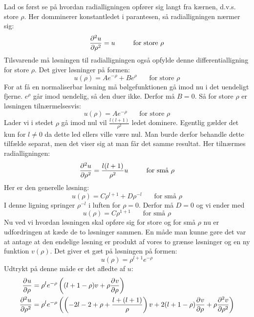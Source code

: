 \documentclass[../../Atom-ogMolekylefysik.tex]{subfiles}
\begin{document}
Lad os først se på hvordan radialligningen opfører sig langt fra kærnen, d.v.s. store $\rho$. Her domminerer konstantledet i parantesen, så radialligningen nærmer sig:
\begin{equation}
    \pdif[2]{\rho}{u}=u~~~~~~~~\text{for store $\rho$}
\end{equation}
Tilsvarende må løsningen til radialligningen også opfylde denne differentialligning for store $\rho$. Det giver løsninger på formen:
\begin{equation}
    u(\rho) = Ae^{-\rho}+B e^\rho~~~~~~~~\text{for store $\rho$}
\end{equation}
For at få en normaliserbar løsning må bølgefunktionen gå imod nu i det uendeligt fjerne. $e^\rho$ går imod uendelig, så den duer ikke. Derfor må $B=0$. Så for store $\rho$ er løsningen tilnærmelsesvis:
\begin{equation}
    u(\rho) = Ae^{-\rho}~~~~~~~~\text{for store $\rho$}
\end{equation}
Lader vi i stedet $\rho$ gå imod nul vil $\frac{l(l+1)}{\rho^2}$ ledet dominere. Egentlig gælder det kun for $l\neq0$ da dette led ellers ville være nul. Man burde derfor behandle dette tilfælde separat, men det viser sig at man får det samme resultat. Her tilnærmes radialligningen:
\begin{equation}
    \pdif[2]{\rho}{u}= \frac{l(l+1)}{\rho^2}u~~~~~~~~\text{for små $\rho$}
\end{equation}
Her er den generelle løsning:
$$
u(\rho) = C\rho^{l+1}+D\rho^{-l}~~~~~~~~\text{for små $\rho$}
$$
I denne ligning springer $\rho^{-l}$ i luften for $\rho=0$. Derfor må $D=0$ og vi ender med
\begin{equation}
    u(\rho) = C\rho^{1+1}~~~~~~~~\text{for små $\rho$}
\end{equation}
Nu ved vi hvordan løsningen skal opføre sig for store og for små $\rho$ nu er udfordringen at kæde de to løsninger sammen. En måde man kunne gøre det var at antage at den endelige løsning er produkt af vores to grænse løsninger og en ny funktion $v(\rho)$. Det giver et gæt på løsningen på formen:
\begin{equation}
    u(\rho) = \rho^{l+1}e^{-\rho}
\end{equation}
Udtrykt på denne måde er det afledte af $u$:
\begin{align*}
    \pdif{\rho}{u}&=\rho^le^{-\rho}\left((l+1-\rho)v+\rho\pdif{\rho} v\right)\\
    \pdif[2]{\rho}{u}&=\rho^le^{-\rho}\left(\left(-2l-2+\rho+\frac{l+(l+1)}{\rho}\right)v+2(l+1-\rho)\pdif{\rho}{v}+\rho\pdif[2]{\rho}{v}\right)
\end{align*}
\end{document}
